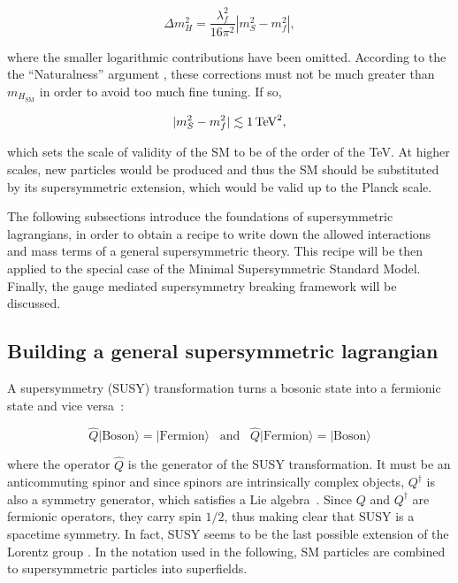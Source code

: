 \begin{equation}
\Delta m_H^2 = \frac{\lambda_f^2}{16\pi^2} |m_S^2 - m_f^2|,
\label{eq:HiggsMassCorrectionNoQuadratic}
\end{equation}

\noindent where the smaller logarithmic contributions have been omitted.
According to the the ``Naturalness'' argument \cite{Witten:1981nf}, these corrections must not be much greater than $m_{H_{\text{SM}}}$ in order to avoid too much fine tuning.
If so,

\begin{equation}
|m_S^2 - m_f^2| \lesssim \unit[1]{TeV}^2,
\label{eq:HiggsNaturalnessCondition}
\end{equation}

\noindent which sets the scale of validity of the SM to be of the order of the TeV.
At higher scales, new particles would be produced and thus the SM should be substituted by its supersymmetric extension, which would be valid up to the Planck scale.

The following subsections introduce the foundations of supersymmetric lagrangians, in order to obtain a recipe to write down the allowed interactions and mass terms of a general supersymmetric theory.
This recipe will be then applied to the special case of the Minimal Supersymmetric Standard Model.
Finally, the gauge mediated supersymmetry breaking framework will be discussed.


\subsection{Building a general supersymmetric lagrangian}

A supersymmetry (SUSY) transformation turns a bosonic state into a fermionic state and vice versa~\cite{Drees:1996ca}:

\begin{equation}
\hat{Q} |\text{Boson}\rangle = |\text{Fermion}\rangle \;\;\;\text{and}\;\;\; \hat{Q} |\text{Fermion}\rangle = |\text{Boson}\rangle
\label{eq:SUSYGeneralTransformation}
\end{equation}

\noindent where the operator $\hat{Q}$ is the generator of the SUSY transformation.
It must be an anticommuting spinor and since spinors are intrinsically complex objects, $Q^\dagger$ is also a symmetry generator, which satisfies a Lie algebra~\cite{Haag}.
Since $Q$ and $Q^\dagger$ are fermionic operators, they carry spin $1/2$, thus making clear that SUSY is a spacetime symmetry.
In fact, SUSY seems to be the last possible extension of the Lorentz group \cite{Haag2}.
In the notation used in the following, SM particles are combined to supersymmetric particles into superfields.


